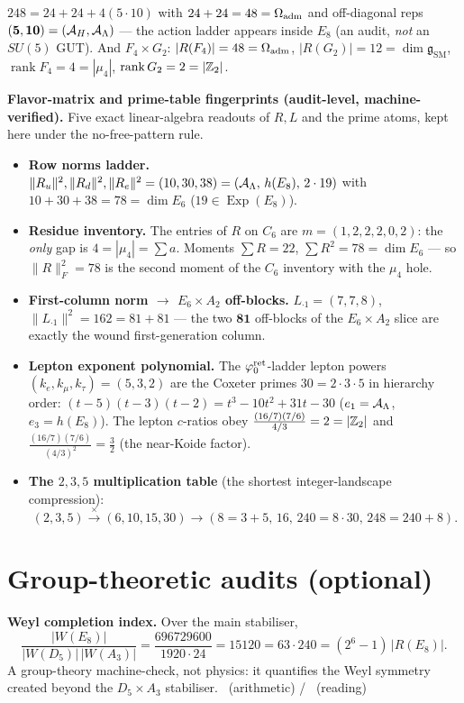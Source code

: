 \begin{proposition}
$248=24+24+4(5\cdot10)$ with $24+24=48=\Omega_{\mathrm{adm}}$ and off-diagonal reps $(\mathbf 5,\mathbf{10})=(\mathcal A_H,\mathcal A_\Lambda)$
--- the action ladder appears inside $E_8$ (an audit, \emph{not} an $SU(5)$ GUT). And
$F_4\times G_2$: $|R(F_4)|=48=\Omega_{\mathrm{adm}}$, $|R(G_2)|=12=\dim\mathfrak g_{\mathrm{SM}}$,
$\operatorname{rank}F_4=4=|\mu_4|$, $\operatorname{rank}G_2=2=|\mathbb{Z}_2|$.
\end{proposition}

\par\smallskip\noindent\textbf{Flavor-matrix and prime-table fingerprints (audit-level, machine-verified).}
Five exact linear-algebra readouts of $R,L$ and the prime atoms, kept here under the no-free-pattern rule.
\begin{itemize}\setlength\itemsep{2pt}
\item\textbf{Row norms ladder.} $\|R_u\|^2,\|R_d\|^2,\|R_e\|^2=(10,30,38)=(\mathcal A_\Lambda,\,h(E_8),\,2\cdot19)$ with
$10{+}30{+}38=78=\dim E_6$ ($19\in\operatorname{Exp}(E_8)$).
\item\textbf{Residue inventory.} The entries of $R$ on $C_6$ are $m=(1,2,2,2,0,2)$: the \emph{only} gap is
$4=|\mu_4|=\sum a$. Moments $\sum R=22$, $\sum R^2=78=\dim E_6$ --- so $\|R\|_F^2=78$ is the second moment
of the $C_6$ inventory with the $\mu_4$ hole.
\item\textbf{First-column norm $\to$ $E_6{\times}A_2$ off-blocks.} $L_{\cdot1}=(7,7,8)$, $\|L_{\cdot1}\|^2=162=81+81$
--- the two $\mathbf{81}$ off-blocks of the $E_6{\times}A_2$ slice are exactly the wound first-generation column.
\item\textbf{Lepton exponent polynomial.} The $\varphi_0^{\mathrm{ret}}$-ladder lepton powers $(k_e,k_\mu,k_\tau)=(5,3,2)$ are
the Coxeter primes $30=2\cdot3\cdot5$ in hierarchy order: $(t-5)(t-3)(t-2)=t^3-10t^2+31t-30$
($e_1=\mathcal A_\Lambda$, $e_3=h(E_8)$). The lepton $c$-ratios obey $\tfrac{(16/7)(7/6)}{4/3}=2=|\mathbb{Z}_2|$ and
$\tfrac{(16/7)(7/6)}{(4/3)^2}=\tfrac32$ (the near-Koide factor).
\item\textbf{The $2,3,5$ multiplication table} (the shortest integer-landscape compression):
\[
  (2,3,5)\xrightarrow{\times}(6,10,15,30)\xrightarrow{}(8{=}3{+}5,\,16,\,240{=}8\cdot30,\,248{=}240{+}8).
\]
\end{itemize}
\par\smallskip

\section{Group-theoretic audits (optional)}
\par\smallskip\noindent\textbf{Weyl completion index.}
Over the main stabiliser,
\[
  \frac{|W(E_8)|}{|W(D_5)|\,|W(A_3)|}=\frac{696729600}{1920\cdot24}=15120=63\cdot240=(2^6-1)\,|R(E_8)| .
\]
A group-theory machine-check, not physics: it quantifies the Weyl symmetry created beyond the
$D_5\times A_3$ stabiliser. \mE\ (arithmetic) / \mO\ (reading)
\par\smallskip

